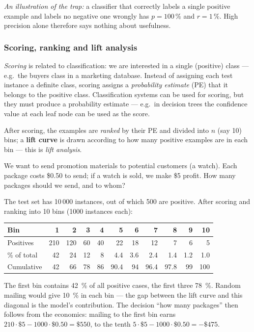 \documentclass[11pt,a4paper]{article}
\theoremstyle{definition}
\providecommand{\uv}[1]{``#1''}
\begin{document}
\emph{An illustration of the trap:} a classifier that correctly labels a single positive example and
labels no negative one wrongly has $p=100\,\%$ and $r=1\,\%$. High precision alone therefore says
nothing about usefulness.

\subsubsection{Scoring, ranking and lift analysis}

\emph{Scoring} is related to classification: we are interested in a single (positive) class ---
e.g.\ the buyers class in a marketing database. Instead of assigning each test instance a definite
class, scoring assigns a \emph{probability estimate} (PE) that it belongs to the positive class.
Classification systems can be used for scoring, but they must produce a probability estimate ---
e.g.\ in decision trees the confidence value at each leaf node can be used as the score.

After scoring, the examples are \emph{ranked} by their PE and divided into $n$ (say 10) bins; a
\textbf{lift curve} is drawn according to how many positive examples are in each bin --- this is
\emph{lift analysis}.

\begin{defbox}
We want to send promotion materials to potential customers (a watch). Each package costs \$0.50 to
send; if a watch is sold, we make \$5 profit. How many packages should we send, and to whom?

The test set has 10\,000 instances, out of which 500 are positive. After scoring and ranking into
10 bins (1000 instances each):

\begin{center}
\small
\begin{tabular}{@{}lrrrrrrrrrr@{}}
\toprule
Bin & 1 & 2 & 3 & 4 & 5 & 6 & 7 & 8 & 9 & 10 \\
\midrule
Positives & 210 & 120 & 60 & 40 & 22 & 18 & 12 & 7 & 6 & 5 \\
\% of total & 42 & 24 & 12 & 8 & 4.4 & 3.6 & 2.4 & 1.4 & 1.2 & 1.0 \\
Cumulative & 42 & 66 & 78 & 86 & 90.4 & 94 & 96.4 & 97.8 & 99 & 100 \\
\bottomrule
\end{tabular}
\end{center}

The first bin contains 42~\% of all positive cases, the first three 78~\%. Random mailing would give
10~\% in each bin --- the gap between the lift curve and this diagonal is the model's contribution.
The decision \uv{how many packages} then follows from the economics: mailing to the first bin earns
$210\cdot\$5-1000\cdot\$0.50=\$550$, to the tenth $5\cdot\$5-1000\cdot\$0.50=-\$475$.
\end{defbox}
\end{document}
